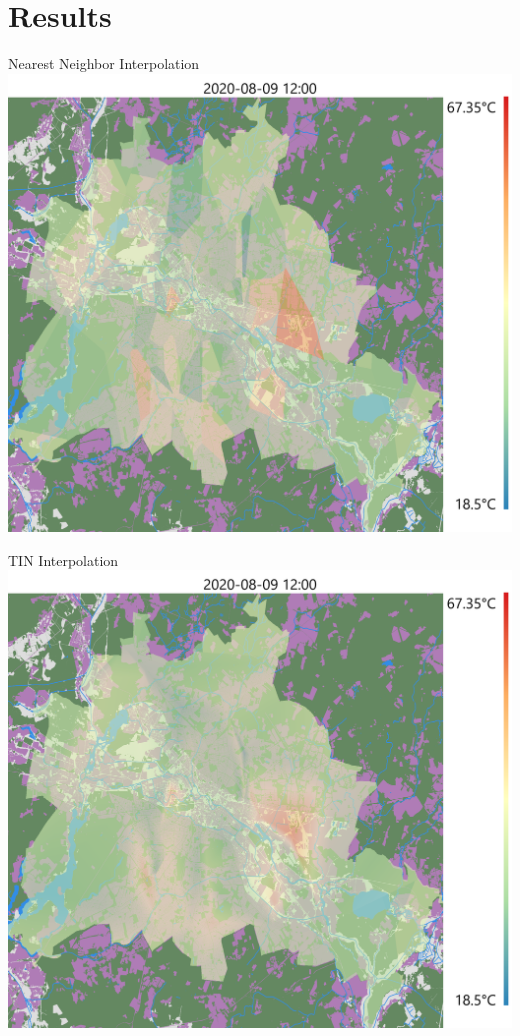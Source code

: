 
\section{Results}
\begin{frame}{Nearest Neighbor Interpolation}
	\centering
	\includegraphics[height=\textheight,keepaspectratio]{../writeup/images/hot_2020-08-09_12_00_nearest.png}
\end{frame}
\begin{frame}{TIN Interpolation}
	\centering
	\includegraphics[height=\textheight,keepaspectratio]{../writeup/images/hot_2020-08-09_12_00_linear.png}
\end{frame}
